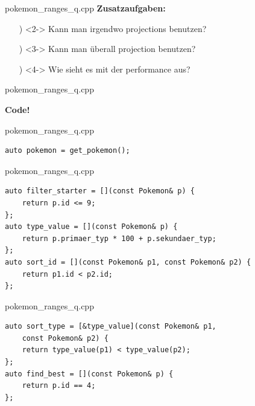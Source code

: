 \begin{frame}{pokemon\_ranges\_q.cpp}
    \textbf{Zusatzaufgaben:}\\
    \begin{enumerate} %
        \item[\✨)]<2-> Kann man irgendwo projections benutzen?
        \item[\✨)]<3-> Kann man überall projection benutzen?
        \item[\✨)]<4-> Wie sieht es mit der performance aus?
    \end{enumerate}
\end{frame}

\begin{frame}{pokemon\_ranges\_q.cpp}
    \begin{center}
        \textbf{Code!}
    \end{center}
\end{frame}

\begin{frame}[fragile]{pokemon\_ranges\_q.cpp}
    \begin{verbatim}
auto pokemon = get_pokemon();
    \end{verbatim}
\end{frame}

\begin{frame}[fragile]{pokemon\_ranges\_q.cpp}
    \begin{verbatim}
auto filter_starter = [](const Pokemon& p) {
    return p.id <= 9;
};
auto type_value = [](const Pokemon& p) {
    return p.primaer_typ * 100 + p.sekundaer_typ;
};
auto sort_id = [](const Pokemon& p1, const Pokemon& p2) {
    return p1.id < p2.id;
};
    \end{verbatim}
\end{frame}

\begin{frame}[fragile]{pokemon\_ranges\_q.cpp}
    \begin{verbatim}
auto sort_type = [&type_value](const Pokemon& p1,
    const Pokemon& p2) {
    return type_value(p1) < type_value(p2);
};
auto find_best = [](const Pokemon& p) {
    return p.id == 4;
};
    \end{verbatim}
\end{frame}

